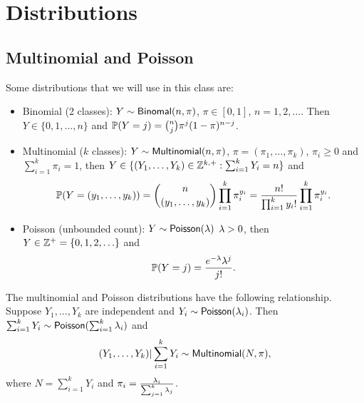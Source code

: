 \section{Distributions}
\subsection{Multinomial and Poisson}
Some distributions that we will use in this class are:
\begin{itemize}
    \item Binomial (2 classes): $Y \sim \mathsf{Binomal}(n,\pi)$, $\pi \in [0,1]$, $n=1,2,\ldots$. Then $Y \in \{0,1,\ldots,n\}$ and ${\mathbb{P}}(Y=j) = \binom{n}{j} \pi^j(1-\pi)^{n-j}$. 
    \item Multinomial ($k$ classes): $Y \sim \mathsf{Multinomial}(n,\pi)$, $\pi = (\pi_1,\ldots, \pi_k)$, $\pi_i \ge 0$ and $\sum_{i=1}^k \pi_i = 1$, then $Y \in \{(Y_1,\ldots,Y_k) \in {{\mathbb Z}}^{k,+}: \sum_{i=1}^k Y_i = n\}$ and 
    \[{\mathbb{P}}(Y=(y_1,\ldots,y_k)) = \binom{n}{(y_1,\ldots,y_k)} \prod_{i=1}^k \pi_i^{y_i} = \frac{n!}{\prod_{i=1}^k y_i!}\prod_{i=1}^k \pi_i^{y_i}.\]
    \item Poisson (unbounded count): $Y \sim \mathsf{Poisson}(\lambda) $ $\lambda > 0$, then $Y \in {{\mathbb Z}}^+ =\{0,1,2,\ldots\}$ and \[{\mathbb{P}}(Y=j) = \frac{e^{-\lambda}\lambda^j}{j!}.\]
\end{itemize}
The multinomial and Poisson distributions have the following relationship. Suppose $Y_1,\ldots,Y_k$ are independent and $Y_i \sim \mathsf{Poisson}(\lambda_i)$. Then $\sum_{i=1}^k Y_i \sim \mathsf{Poisson}(\sum_{i=1}^k \lambda_i)$ and 
\[(Y_1,\ldots, Y_k)|\sum_{i=1}^k Y_i \sim \mathsf{Multinomial}(N,\pi), \]
where $N=\sum_{i=1}^k Y_i$ and $\pi_i = \frac{\lambda_i}{\sum_{j=1}^k \lambda_j}$.
